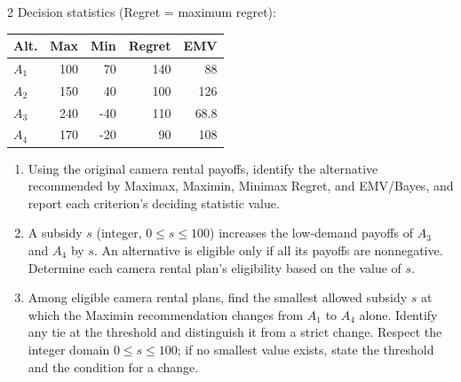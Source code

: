 \begin{multicols}{2}
\columnbreak
Decision statistics (Regret = maximum regret):

\vspace{-3mm}
\begin{center}\small\setlength{\tabcolsep}{4pt}
	\begin{tabular}{lrrrr}\toprule
		Alt. & Max & Min & Regret & EMV\\ \midrule
		$A_1$ & 100 & 70 & 140 & 88\\
		$A_2$ & 150 & 40 & 100 & 126\\
		$A_3$ & 240 & -40 & 110 & 68.8\\
		$A_4$ & 170 & -20 & 90 & 108\\
		\bottomrule
	\end{tabular}
\end{center}
\vspace{-3mm}

\begin{enumerate}[label=\textbf{(\alph*)},leftmargin=*]
	\item Using the original camera rental payoffs, identify the alternative recommended by Maximax, Maximin, Minimax Regret, and EMV/Bayes, and report each criterion's deciding statistic value. 

	\item A subsidy $s$ (integer, $0\leq s\leq100$) increases the low-demand payoffs of $A_3$ and $A_4$ by $s$. An alternative is eligible only if all its payoffs are nonnegative. Determine each camera rental plan's eligibility based on the value of $s$. 

	\item Among eligible camera rental plans, find the smallest allowed subsidy $s$ at which the Maximin recommendation changes from $A_1$ to $A_4$ alone. Identify any tie at the threshold and distinguish it from a strict change. Respect the integer domain $0\leq s\leq100$; if no smallest value exists, state the threshold and the condition for a change. 
\end{enumerate}


\end{multicols}
\newpage
